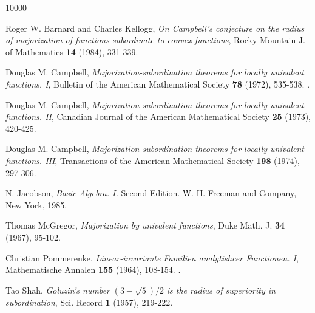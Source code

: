 \documentclass[12pt]{article}
\begin{document}
\begin{thebibliography}{10000}

Roger W. Barnard and Charles Kellogg, \emph{On Campbell's conjecture on the radius of majorization of functions subordinate to convex functions}, Rocky Mountain J. of Mathematics \textbf{14} (1984), 331-339. 

Douglas M. Campbell, \emph{Majorization-subordination theorems for locally univalent functions. I}, Bulletin
  of the American Mathematical Society \textbf{78} (1972), 535-538. .
  
Douglas M. Campbell, \emph{Majorization-subordination theorems for locally univalent functions. II}, Canadian 
  Journal of the American Mathematical Society \textbf{25} (1973), 420-425. 
  
Douglas M. Campbell, \emph{Majorization-subordination theorems for locally univalent functions. III}, Transactions
  of the American Mathematical Society \textbf{198} (1974), 297-306. 
  
 N. Jacobson, 
\textit{Basic Algebra. I.} Second Edition.  W. H. Freeman and Company, New York, 1985. %

 Thomas McGregor,
\emph{Majorization by univalent functions}, Duke Math. J. \textbf{34} (1967), 95-102.

Christian Pommerenke, \emph{Linear-invariante Familien analytishcer Functionen. I}, Mathematische Annalen \textbf{155} 
  (1964), 108-154. .
  
 Tao Shah, \emph{Goluzin's number} $(3-\sqrt{5})/2$ \emph{is the radius of superiority in subordination},
  Sci. Record \textbf{1} (1957), 219-222.
  
\end{thebibliography}
\end{document}
